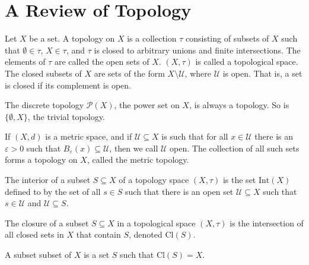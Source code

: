 \documentclass{article}                                                        %
\begin{document}
    \section{A Review of Topology}
        \begin{definition}
            Let $X$ be a set. A topology on $X$ is a collection $\tau$
            consisting of subsets of $X$ such that $\emptyset\in\tau$,
            $X\in\tau$, and $\tau$ is closed to arbitrary unions and finite
            intersections. The elements of $\tau$ are called the open sets of
            $X$. $(X,\tau)$ is called a topological space. The closed subsets
            of $X$ are sets of the form $X\setminus\mathcal{U}$, where
            $\mathcal{U}$ is open. That is, a set is closed if its complement is
            open.
        \end{definition}
        \begin{example}
            The discrete topology $\mathcal{P}(X)$, the power set on $X$, is
            always a topology. So is $\{\emptyset,X\}$, the trivial topology.
        \end{example}
        \begin{example}
            If $(X,d)$ is a metric space, and if $\mathcal{U}\subseteq{X}$ is
            such that for all $x\in\mathcal{U}$ there is an $\varepsilon>0$
            such that $B_{\varepsilon}(x)\subseteq\mathcal{U}$, then we call
            $\mathcal{U}$ open. The collection of all such sets forms a topology
            on $X$, called the metric topology.
        \end{example}
        \begin{definition}
            The interior of a subset $S\subseteq{X}$ of a topology space
            $(X,\tau)$ is the set $\textrm{Int}(X)$ defined to by the
            set of all $s\in{S}$ such that there is an open set
            $\mathcal{U}\subseteq{X}$ such that $s\in\mathcal{U}$ and
            $\mathcal{U}\subseteq{S}$.
        \end{definition}
        \begin{definition}
            The closure of a subset $S\subseteq{X}$ in a topological space
            $(X,\tau)$ is the intersection of all closed sets in $X$ that
            contain $S$, denoted $\textrm{Cl}(S)$.
        \end{definition}
        \begin{definition}
            A subset subset of $X$ is a set $S$ such that
            $\textrm{Cl}(S)=X$.
        \end{definition}
\end{document}
